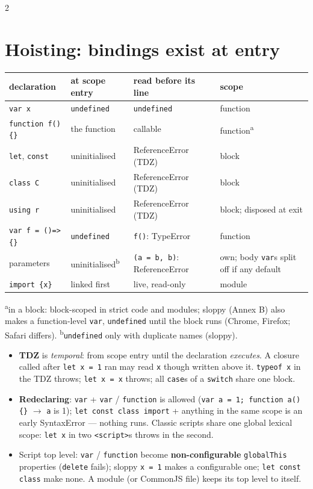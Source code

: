 \documentclass[8pt]{extarticle}
\newcommand\ct[1]{\texttt{#1}}
\newcommand\fat{\hbox{=}\hbox{>}}%
\begin{document}
\begin{multicols}{2}
\section{Hoisting: bindings exist at entry}
{\scriptsize\setlength{\tabcolsep}{2pt}
\begin{tabular}{@{}>{\raggedright}p{17mm}>{\raggedright}p{17mm}>{\raggedright}p{23mm}>{\raggedright\arraybackslash}p{18mm}@{}}
\toprule
\textbf{declaration} & \textbf{at scope entry} & \textbf{read before its line} & \textbf{scope} \\ \midrule
\ct{var x} & \ct{undefined} & \ct{undefined} & function \\
\ct{function f()\{\}} & the function & callable & function\textsuperscript{a} \\
\ct{let}, \ct{const} & uninitialised & ReferenceError (TDZ) & block \\
\ct{class C} & uninitialised & ReferenceError (TDZ) & block \\
\ct{using r} & uninitialised & ReferenceError (TDZ) & block; disposed at exit \\
\ct{var f = ()\fat\{\}} & \ct{undefined} & \ct{f()}: TypeError & function \\
parameters & uninitialised\textsuperscript{b} & \ct{(a = b, b)}: ReferenceError & own; body \ct{var}s split off if any default \\
\ct{import \{x\}} & linked first & live, read-only & module \\ \bottomrule
\end{tabular}\pdfonly{\\[1pt]}
\textsuperscript{a}in a block: block-scoped in strict code and modules; sloppy (Annex B) also
makes a function-level \ct{var}, \ct{undefined} until the block runs (Chrome, Firefox; Safari
differs). \textsuperscript{b}\ct{undefined} only with duplicate names (sloppy).}
\begin{itemize}
  \item \textbf{TDZ} is \emph{temporal}: from scope entry until the declaration
        \emph{executes}. A closure called after \ct{let x = 1} ran may read \ct{x} though written
        above it. \ct{typeof x} in the TDZ throws; \ct{let x = x} throws; all \ct{case}s of a
        \ct{switch} share one block.
  \item \textbf{Redeclaring}: \ct{var} + \ct{var} / \ct{function} is allowed (\ct{var a = 1;
        function a()\{\}} $\rightarrow$ \ct{a} is 1); \ct{let const class import} + anything in the
        same scope is an early SyntaxError — nothing runs. Classic scripts share one global
        lexical scope: \ct{let x} in two \ct{<script>}s throws in the second.
  \item Script top level: \ct{var} / \ct{function} become \textbf{non-configurable}
        \ct{globalThis} properties (\ct{delete} fails); sloppy \ct{x = 1} makes a configurable
        one; \ct{let const class} make none. A module (or CommonJS file) keeps its top level to
        itself.
\end{itemize}


\end{multicols}
\end{document}
